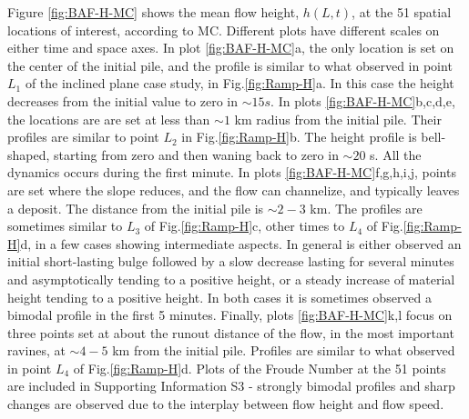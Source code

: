 \documentclass{article}
\begin{document}
Figure \ref{fig:BAF-H-MC} shows the mean flow height, $h(L,t)$, at the 51 spatial locations of interest, according to MC. Different plots have different scales on either time and space axes. In plot \ref{fig:BAF-H-MC}a, the only location is set on the center of the initial pile, and the profile is similar to what observed in point $L_1$ of the inclined plane case study, in Fig.\ref{fig:Ramp-H}a. In this case the height decreases from the initial value to zero in $\sim 15 s$. In plots \ref{fig:BAF-H-MC}b,c,d,e, the locations are are set at less than $\sim 1$ km radius from the initial pile. Their profiles are similar to point $L_2$ in Fig.\ref{fig:Ramp-H}b. The height profile is bell-shaped, starting from zero and then waning back to zero in $\sim 20$ s. All the dynamics occurs during the first minute. In plots \ref{fig:BAF-H-MC}f,g,h,i,j, points are set where the slope reduces, and the flow can channelize, and typically leaves a deposit. The distance from the initial pile is $\sim 2-3$ km. The profiles are sometimes similar to $L_3$ of Fig.\ref{fig:Ramp-H}c, other times to $L_4$ of Fig.\ref{fig:Ramp-H}d, in a few cases showing intermediate aspects. In general is either observed an initial short-lasting bulge followed by a slow decrease lasting for several minutes and asymptotically tending to a positive height, or a steady increase of material height tending to a positive height. In both cases it is sometimes observed a bimodal profile in the first 5 minutes. Finally, plots \ref{fig:BAF-H-MC}k,l focus on three points set at about the runout distance of the flow, in the most important ravines, at $\sim 4-5$ km from the initial pile. Profiles are similar to what observed in point $L_4$ of Fig.\ref{fig:Ramp-H}d. Plots of the Froude Number at the 51 points are included in Supporting Information S3 - strongly bimodal profiles and sharp changes are observed due to the interplay between flow height and flow speed.
\end{document}
